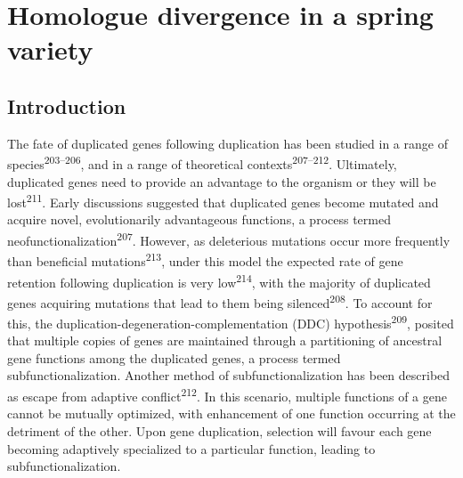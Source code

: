 \documentclass[12pt,]{book}
\begin{document}
\chapter{Homologue divergence in a spring variety}\label{chapter:spring}

\section{Introduction}\label{section:spring_introduction}

The fate of duplicated genes following duplication has been studied in a
range of species\textsuperscript{203--206}, and in a range of
theoretical contexts\textsuperscript{207--212}. Ultimately, duplicated
genes need to provide an advantage to the organism or they will be
lost\textsuperscript{211}. Early discussions suggested that duplicated
genes become mutated and acquire novel, evolutionarily advantageous
functions, a process termed neofunctionalization\textsuperscript{207}.
However, as deleterious mutations occur more frequently than beneficial
mutations\textsuperscript{213}, under this model the expected rate of
gene retention following duplication is very low\textsuperscript{214},
with the majority of duplicated genes acquiring mutations that lead to
them being silenced\textsuperscript{208}. To account for this, the
duplication-degeneration-complementation (DDC)
hypothesis\textsuperscript{209}, posited that multiple copies of genes
are maintained through a partitioning of ancestral gene functions among
the duplicated genes, a process termed subfunctionalization. Another
method of subfunctionalization has been described as escape from
adaptive conflict\textsuperscript{212}. In this scenario, multiple
functions of a gene cannot be mutually optimized, with enhancement of
one function occurring at the detriment of the other. Upon gene
duplication, selection will favour each gene becoming adaptively
specialized to a particular function, leading to subfunctionalization.
\end{document}
